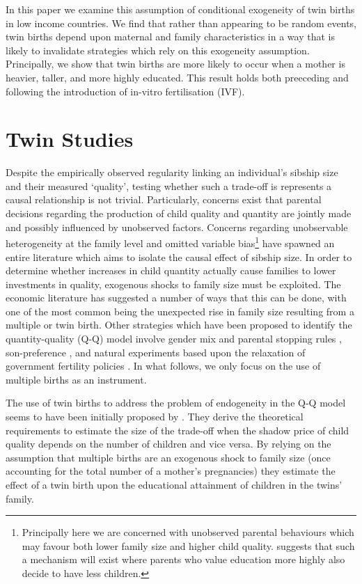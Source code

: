 \documentclass{article}[12pt,subeqn]
\begin{document}
\begin{spacing}{1.5}
In this paper we examine this assumption of conditional exogeneity of twin births in low income countries.  We find that rather than appearing to be random events, 
twin births depend upon maternal and family characteristics in a way that is likely to invalidate strategies which rely on this exogeneity assumption.  Principally, 
we show that twin births are more likely to occur when a mother is heavier, taller, and more highly educated.  This result holds both preeceding and following the introduction
of in-vitro fertilisation (IVF).


\section{Twin Studies}
\label{scn:lit}
\vspace{-5mm}
Despite the empirically observed regularity linking an individual's sibship size and their measured `quality', testing whether such a trade-off is represents a
causal relationship is not trivial.  Particularly, concerns exist that parental decisions regarding the production of child quality and quantity are jointly made and 
possibly influenced by unobserved factors.  Concerns regarding unobservable heterogeneity at the family level and omitted variable bias\footnote{Principally 
here we are concerned with unobserved parental 
behaviours which may favour both lower family size and higher child quality.  \citet{Qian2009} suggests that such a mechanism will exist where parents who 
value education more highly also decide to have less children.} have spawned an entire literature which aims to isolate the causal effect of sibship size.  In 
order to determine whether increases in child quantity actually cause families to lower investments in quality, exogenous shocks to family size must be exploited.  
The economic literature has suggested a number of ways that this can be done, with one of the most common being the unexpected rise in family size resulting 
from a multiple or twin birth.  Other strategies which have been 
proposed to identify the quantity-quality (Q-Q) model involve gender mix and parental stopping rules \citep{ConleyGlauber2006}, son-preference \citep{Lee2008}, 
and natural experiments based upon the relaxation of government fertility policies \citep{Qian2009}.   In what follows, we only focus on the use of multiple 
births as an instrument.


The use of twin births to address the problem of endogeneity in the Q-Q model seems to have been initially proposed by \citet{RosenzweigWolpin1980}.  
They derive the theoretical requirements to estimate the size of the trade-off when the shadow price of child quality depends on the number 
of children and vice versa.  By relying on the assumption that multiple births are an exogenous shock to family size (once accounting for 
the total number of a mother's pregnancies) they estimate the effect of a twin birth upon the educational attainment of children in the twins' 
family.  


\end{spacing}
\end{document}
